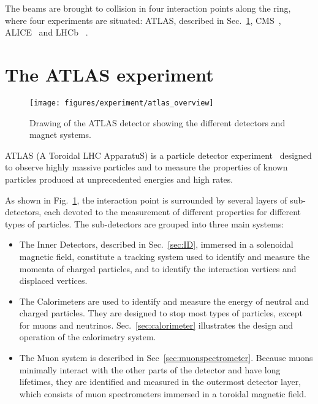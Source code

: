 The beams are brought to collision in four interaction points along
the ring, where four experiments are situated: 
ATLAS, described in Sec.~\ref{sec:ATLAS}, CMS~\cite{cms}, ALICE~\cite{alice} and LHCb~\cite{lhcb} .

\section{The ATLAS experiment}
\label{sec:ATLAS}

\begin{figure}[h]
\begin{center}
\texttt{[image: figures/experiment/atlas\_overview]}
\caption[Drawing of the ATLAS detector]{
  Drawing of the ATLAS detector showing the different detectors and magnet systems.}
\label{fig:ATLAS}
\end{center}
\end{figure}

ATLAS (A Toroidal LHC ApparatuS) is a particle detector
experiment~\cite{detectorpaper} designed to observe highly massive
particles and to measure the properties of known particles produced at
unprecedented energies and high rates. 

As shown in Fig.~\ref{fig:ATLAS}, the interaction point is surrounded
by several layers of sub-detectors, each devoted to the measurement of
different properties for different types of particles.
The sub-detectors are grouped into three main systems:

\begin{itemize}
\item The Inner Detectors, described in Sec.~\ref{sec:ID}, immersed in
  a solenoidal magnetic field, constitute a tracking system used to
  identify and measure the momenta of charged particles, and to identify
  the interaction vertices and displaced vertices. 
\item The Calorimeters are used to identify and measure the energy of
  neutral and charged particles. They are designed to stop most types
  of particles, except for muons and
  neutrinos. Sec.~\ref{sec:calorimeter} illustrates the design and
  operation of the calorimetry system.
\item The Muon system is described in
  Sec~\ref{sec:muonspectrometer}. Because muons minimally interact
  with the other parts of the detector and have long lifetimes, they
  are identified and measured in the outermost detector
  layer, which consists of muon spectrometers immersed in a toroidal magnetic field. 
\end{itemize}

